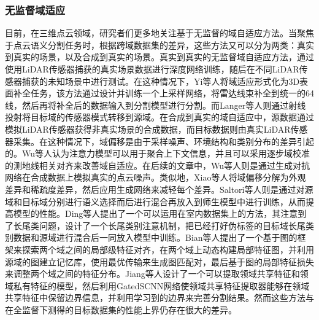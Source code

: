 \subsubsection{无监督域适应}
目前，在三维点云领域，研究者们更多地关注基于无监督的域自适应方法。当聚焦于点云语义分割任务时，根据跨域数据集的差异，这些方法又可以分为两类：真实到真实的场景，以及合成到真实的场景。真实到真实的无监督域自适应方法，通过使用LiDAR传感器捕获的真实场景数据进行深度网络训练，随后在不同LiDAR传感器捕获的未知场景中进行测试。在这种情况下，Yi等人将域适应形式化为3D表面补全任务，该方法通过设计并训练一个上采样网络，将雷达线束补全到统一的64线，然后再将补全后的数据输入到分割模型进行分割。而Langer等人则通过射线投射将目标域的传感器模式转移到源域。在合成到真实的域自适应中，源数据通过模拟LiDAR传感器获得非真实场景的合成数据，而目标数据则由真实LiDAR传感器采集。在这种情况下，域偏移是由于采样噪声、环境结构和类别分布的差异引起的。Wu等人认为注意力模型可以用于聚合上下文信息，并且可以采用逐步域校准的测地线相关对齐来改善域自适应。在后续的文章中，Wu等人则是通过生成对抗网络在合成数据上模拟真实的点云噪声。类似地，Xiao等人将域偏移分解为外观差异和稀疏度差异，然后应用生成网络来减轻每个差异。Saltori等人则是通过对源域和目标域分别进行语义选择而后进行混合再放入到师生模型中进行训练，从而提高模型的性能。Ding等人提出了一个可以运用在室内数据集上的方法，其注意到了长尾类问题，设计了一个长尾类别注意机制，把已经打好伪标签的目标域长尾类别数据和源域进行混合后一同放入模型中训练。Bian等人提出了一个基于图的框架来探索两个域之间的局部级特征对齐，在两个域上动态构建局部特征图，并利用源域的图建立记忆库，使用最优传输来生成图匹配对，最后基于图的局部特征损失来调整两个域之间的特征分布。Jiang等人设计了一个可以提取领域共享特征和领域私有特征的模型，然后利用GatedSCNN网络使领域共享特征提取器能够在领域共享特征中保留边界信息，并利用学习到的边界来完善分割结果。然而这些方法与在全监督下测得的目标数据集的性能上界仍存在很大的差异。
